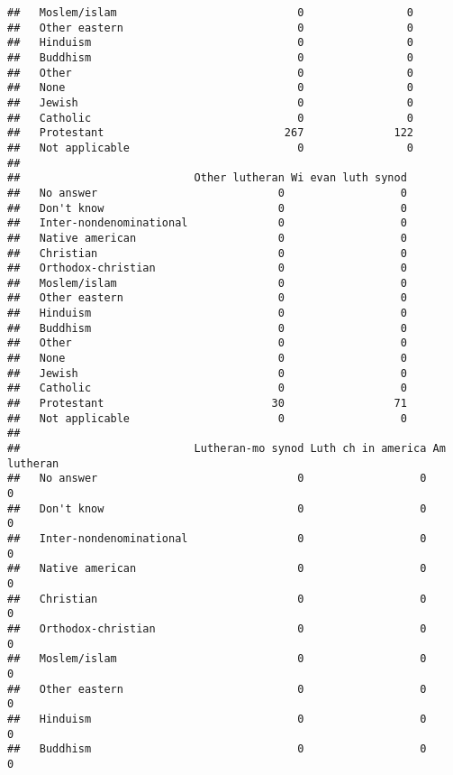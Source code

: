 \documentclass[]{article}
\theoremstyle{definition}
\theoremstyle{definition}
\theoremstyle{definition}
\theoremstyle{remark}
\begin{document}
\begin{verbatim}
##   Moslem/islam                            0                0
##   Other eastern                           0                0
##   Hinduism                                0                0
##   Buddhism                                0                0
##   Other                                   0                0
##   None                                    0                0
##   Jewish                                  0                0
##   Catholic                                0                0
##   Protestant                            267              122
##   Not applicable                          0                0
##                          
##                           Other lutheran Wi evan luth synod
##   No answer                            0                  0
##   Don't know                           0                  0
##   Inter-nondenominational              0                  0
##   Native american                      0                  0
##   Christian                            0                  0
##   Orthodox-christian                   0                  0
##   Moslem/islam                         0                  0
##   Other eastern                        0                  0
##   Hinduism                             0                  0
##   Buddhism                             0                  0
##   Other                                0                  0
##   None                                 0                  0
##   Jewish                               0                  0
##   Catholic                             0                  0
##   Protestant                          30                 71
##   Not applicable                       0                  0
##                          
##                           Lutheran-mo synod Luth ch in america Am lutheran
##   No answer                               0                  0           0
##   Don't know                              0                  0           0
##   Inter-nondenominational                 0                  0           0
##   Native american                         0                  0           0
##   Christian                               0                  0           0
##   Orthodox-christian                      0                  0           0
##   Moslem/islam                            0                  0           0
##   Other eastern                           0                  0           0
##   Hinduism                                0                  0           0
##   Buddhism                                0                  0           0

\end{verbatim}
\end{document}
